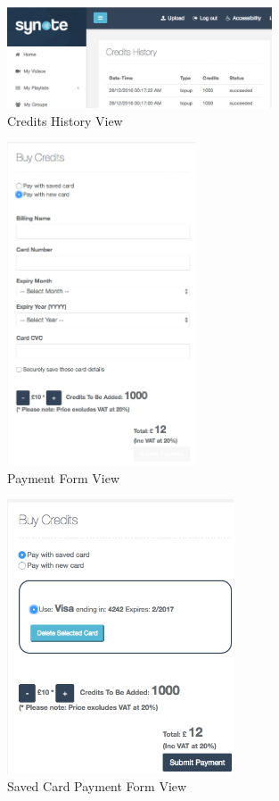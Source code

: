 \begin{figure}[!hbt]
    \centering
  \includegraphics[width=0.7\textwidth]{screenshot-credit-history.png}
    \caption{Credits History View}
  \label{fig:credits-history-screenshot}
\end{figure}

\begin{figure}[!hbt]
    \centering
  \includegraphics[width=0.5\textwidth]{screenshot-payment-form.png}
    \caption{Payment Form View}
  \label{fig:payment-form-screenshot}
\end{figure}

\begin{figure}[!hbt]
    \centering
  \includegraphics[width=0.6\textwidth]{screenshot-saved-card-form.png}
    \caption{Saved Card Payment Form View}
  \label{fig:saved-cards-form-screenshot}
\end{figure}

